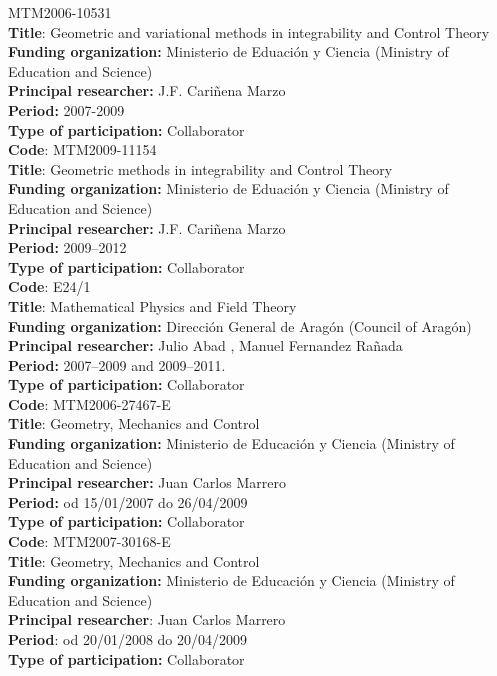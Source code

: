 \documentclass[12pt,reqno]{amsbook}
\begin{document}
 MTM2006-10531\\
{\bf Title}: Geometric and variational methods in integrability and Control Theory\\
{\bf Funding organization:} Ministerio de Eduaci\'on y Ciencia (Ministry of Education and Science) \\
{\bf Principal researcher:} J.F. Cari\~nena Marzo \\
{\bf Period:} 2007-2009\\
{\bf Type of participation:} Collaborator\\

\noindent
{\bf Code}: MTM2009-11154\\
{\bf Title}: Geometric methods in integrability and Control Theory\\
{\bf Funding organization:} Ministerio de Eduaci\'on y Ciencia (Ministry of Education and Science) \\
{\bf Principal researcher:} J.F. Cari\~nena Marzo \\
{\bf Period:} 2009--2012\\
{\bf Type of participation:} Collaborator\\


\noindent
{\bf Code}: E24/1\\
{\bf Title}: Mathematical Physics and Field Theory\\
{\bf Funding organization:} Direcci\'on General de Arag\'on (Council of Arag\'on) \\
{\bf Principal researcher:} Julio Abad , Manuel Fernandez Ra\~nada \\
{\bf Period:} 2007--2009 and 2009--2011.\\
{\bf Type of participation:} Collaborator\\


\noindent
{\bf Code}: MTM2006-27467-E\\
{\bf Title}: Geometry, Mechanics and Control\\
{\bf Funding organization:} Ministerio de Educaci\'on y Ciencia (Ministry of Education and Science) \\
{\bf Principal researcher:} Juan Carlos Marrero \\
{\bf Period:} od 15/01/2007 do 26/04/2009\\
{\bf Type of participation:} Collaborator\\


\noindent
{\bf Code}: MTM2007-30168-E\\
{\bf Title}: Geometry, Mechanics and Control\\
{\bf Funding organization:} Ministerio de Educaci\'on y Ciencia (Ministry of Education and Science)\\
{\bf Principal researcher}: Juan Carlos Marrero \\
{\bf Period}: od 20/01/2008 do 20/04/2009\\
{\bf Type of participation:} Collaborator\\
\end{document}
